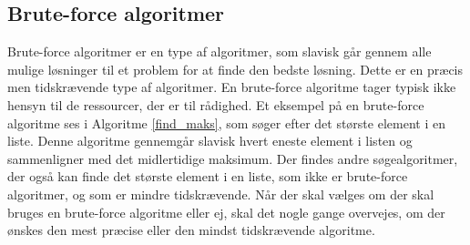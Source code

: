 \subsection{Brute-force algoritmer}
Brute-force algoritmer er en type af algoritmer, som slavisk går gennem alle mulige løsninger til et problem for at finde den bedste løsning.
Dette er en præcis men tidskrævende type af algoritmer. 
En brute-force algoritme tager typisk ikke hensyn til de ressourcer, der er til rådighed.
Et eksempel på en brute-force algoritme ses i Algoritme \ref{find_maks}, som søger efter det største element i en liste. 
Denne algoritme gennemgår slavisk hvert eneste element i listen og sammenligner med det midlertidige maksimum.
Der findes andre søgealgoritmer, der også kan finde det største element i en liste, som ikke er brute-force algoritmer, og som er mindre tidskrævende. 
Når der skal vælges om der skal bruges en brute-force algoritme eller ej, skal det nogle gange overvejes, om der ønskes den mest præcise eller den mindst tidskrævende algoritme. 
